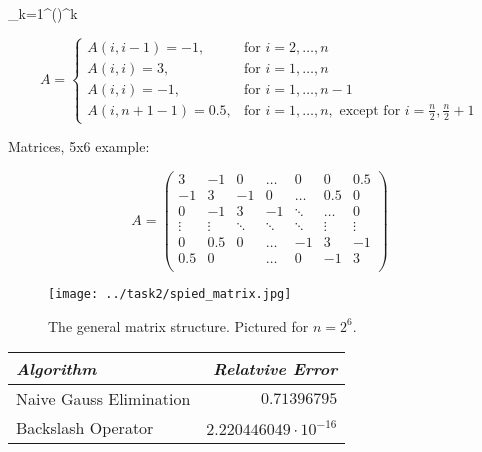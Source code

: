 
\usepackage{float}

\displaystyle\sum_{k=1}^\infty \left(\right)^k

\begin{center}
  \begin{equation}
    \label{int:mat}
    A = \left\{
    \begin{array}{lr}
      A(i, i-1) = -1,    & \text{for } i = 2, \ldots , n   \\
      A(i,i) = 3,        & \text{for } i = 1, \ldots , n   \\
      A(i,i) = -1,       & \text{for } i = 1, \ldots , n-1 \\
      A(i, n+1-1) = 0.5, & \text{for } i = 1, \ldots , n, \text{ except for }  i = \frac{n}{2}, \frac{n}{2} + 1  
    \end{array}
    \right.
  \end{equation}
\end{center}

Matrices, 5x6 example:
\begin{center}
  \[ A =\left( 
  \begin{array}{ccccccc}
    3      &   -1    &    0    & \ldots &    0    &   0      &  0.5    \\
   -1      &    3    &   -1    &    0   & \ldots  &   0.5    &   0     \\
    0      &   -1    &    3    &   -1   & \ddots  & \ldots   &   0     \\
    \vdots & \vdots  & \ddots  & \ddots & \ddots  & \vdots   &  \vdots \\
    0      &    0.5  &    0    & \ldots &   -1    &    3     &  -1     \\
    0.5    &    0    &         & \ldots &    0    &   -1     &   3     \\
  \end{array}
  \right) \]
\end{center}

\begin{figure}[h]
  \begin{center}
    \texttt{[image: ../task2/spied\_matrix.jpg]}
    \caption{The general matrix structure. Pictured for $n = 2^6$.}
    \label{fig:mstruct}
  \end{center}
\end{figure}

\begin{center}
  \begin{tabular}{|l|r|} \hline
    \label{tab:ngerr}
    \emph{Algorithm}        &   \emph{Relatvive Error}    \\ \hline
    Naive Gauss Elimination &   $0.71396795$              \\ \hline
    Backslash Operator      &   $2.220446049\cdot10^{-16}$ \\ \hline
      \end{tabular}
\end{center} 




\usepackage{verbatim}
 

